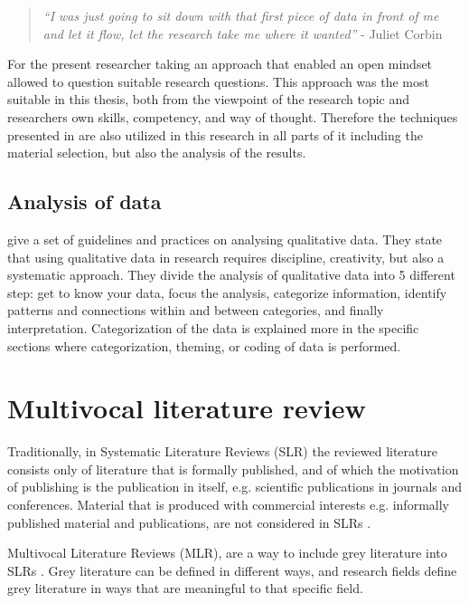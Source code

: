 \documentclass[english, 12pt, a4paper, sci, utf8, a-1b, online]{aaltothesis}
\begin{document}
\begin{quotation}
  \textit{``I was just going to sit down with that first piece of data in front of me and let it flow, let the research take me where it wanted''} - Juliet Corbin \parencite[p.~43]{developing-grounded-theory}
\end{quotation}

For the present researcher taking an approach that enabled an open mindset allowed to question suitable research questions. This approach was the most suitable in this thesis, both from the viewpoint of the research topic and researchers own skills, competency, and way of thought. Therefore the techniques presented in \textcite{developing-grounded-theory} are also utilized in this research in all parts of it including the material selection, but also the analysis of the results.

\subsection{Analysis of data}

\textcite{analyzing-qualitative-data} give a set of guidelines and practices on analysing qualitative data. They state that using qualitative data in research requires discipline, creativity, but also a systematic approach. They divide the analysis of qualitative data into 5 different step: get to know your data, focus the analysis, categorize information, identify patterns and connections within and between categories, and finally interpretation. Categorization of the data is explained more in the specific sections where categorization, theming, or coding of data is performed.

\clearpage
\section{Multivocal literature review} \label{section:multivocal-literature-review}

Traditionally, in Systematic Literature Reviews (SLR) the reviewed literature consists only of literature that is formally published, and of which the motivation of publishing is the publication in itself, e.g. scientific publications in journals and conferences. Material that is produced with commercial interests e.g. informally published material and publications, are not considered in SLRs \parencite{guidelines-for-MLR}.

Multivocal Literature Reviews (MLR), are a way to include grey literature into SLRs \parencite{the-need-for-MLR}. Grey literature can be defined in different ways, and research fields define grey literature in ways that are meaningful to that specific field.
\end{document}
